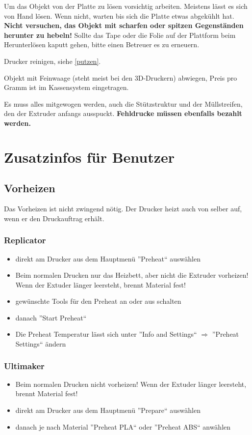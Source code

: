 \documentclass{\basedir/fablab-document}
\begin{document}
Um das Objekt von der Platte zu lösen vorsichtig arbeiten. Meistens lässt es sich von Hand lösen. Wenn nicht,
warten bis sich die Platte etwas abgekühlt hat. \textbf{Nicht versuchen, das Objekt mit scharfen oder spitzen Gegenständen herunter zu hebeln!}
Sollte das Tape oder die Folie auf der Plattform beim Herunterlösen kaputt gehen, bitte einen Betreuer es zu erneuern.

Drucker reinigen, siehe \ref{putzen}.

Objekt mit Feinwaage (steht meist bei den 3D-Druckern) abwiegen, Preis pro Gramm ist im Kassensystem eingetragen. 

Es muss alles mitgewogen werden, auch die Stützstruktur und der Müllstreifen, den der Extruder anfangs ausspuckt. \textbf{Fehldrucke müssen ebenfalls bezahlt werden.}
\section{Zusatzinfos für Benutzer}
\subsection{Vorheizen} \label{vorheizen}
Das Vorheizen ist nicht zwingend nötig. Der Drucker heizt auch von selber auf, wenn er den Druckauftrag erhält.

\subsubsection{Replicator}
\begin{itemize}
 \item direkt am Drucker aus dem Hauptmenü ''Preheat`` auswählen
 \item Beim normalen Drucken nur das Heizbett, aber nicht die Extruder vorheizen! Wenn der Extuder länger leersteht, brennt Material fest!
 \item gewünschte Tools für den Preheat an oder aus schalten
 \item danach ''Start Preheat``
 \item Die Preheat Temperatur lässt sich unter ''Info and Settings`` $\Rightarrow$ ''Preheat Settings`` ändern
\end{itemize}

\subsubsection{Ultimaker}
\begin{itemize}
 \item Beim normalen Drucken nicht vorheizen! Wenn der Extuder länger leersteht, brennt Material fest!
 \item direkt am Drucker aus dem Hauptmenü ''Prepare`` auswählen
 \item danach je nach Material ''Preheat PLA`` oder ''Preheat ABS`` anwählen
\end{itemize}
\end{document}
